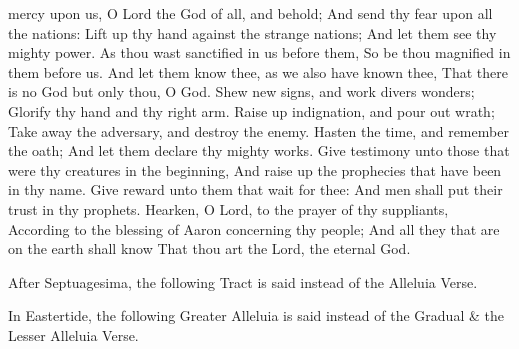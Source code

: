  mercy upon us, O Lord the God of all, and behold; And send thy fear upon all the nations: Lift up thy hand against the strange nations; And let them see thy mighty power. As thou wast sanctified in us before them, So be thou magnified in them before us. And let them know thee, as we also have known thee, That there is no God but only thou, O God. Shew new signs, and work divers wonders; Glorify thy hand and thy right arm. Raise up indignation, and pour out wrath; Take away the adversary, and destroy the enemy. Hasten the time, and remember the oath; And let them declare thy mighty works. Give testimony unto those that were thy creatures in the beginning, And raise up the prophecies that have been in thy name. Give reward unto them that wait for thee: And men shall put their trust in thy prophets. Hearken, O Lord, to the prayer of thy suppliants, According to the blessing of Aaron concerning thy people; And all they that are on the earth shall know That thou art the Lord, the eternal God. 


\begin{rubric}
    After Septuagesima, the following Tract is said instead of the Alleluia Verse.
\end{rubric}


\begin{rubric}
    In Eastertide, the following Greater Alleluia is said instead of the Gradual \& the Lesser Alleluia Verse.
\end{rubric}


